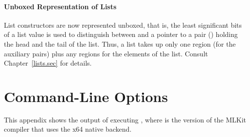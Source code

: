 \documentclass[12pt]{book}
\begin{document}
\subsubsection*{Unboxed Representation of Lists}
 List constructors are now represented unboxed, that is,
the least significant bits of a list value is used to distinguish
between  and a pointer to a pair (\boxml{::}) holding the
head and the tail of the list. Thus, a list takes up only one region
(for the auxiliary pairs) plus any regions for the elements of the
list. Consult Chapter~\ref{lists.sec} for details.

\nocite{total97,total94,btv96,elshal95,KochHojfeld96,H96,hallenberg99,brtt93,hosc-regions2004}




\appendix

\chapter{Command-Line Options}
\label{mlkithelp.app}
This appendix shows the output of executing
%
, where  is the version of the MLKit
compiler that uses the
%
x64 native backend.
\end{document}
